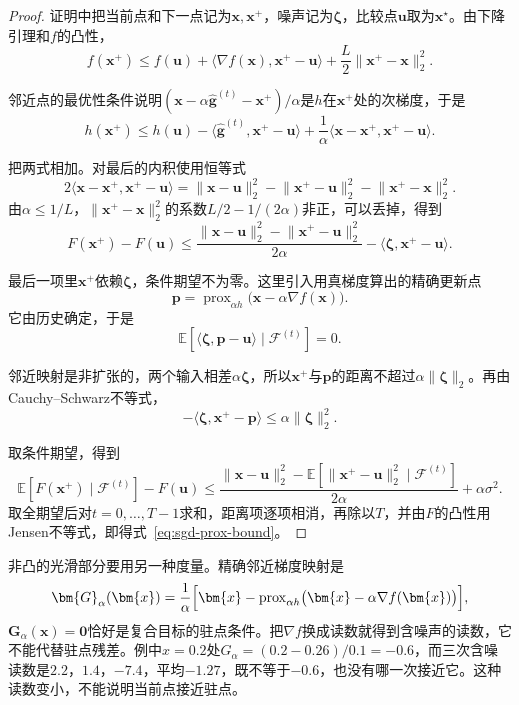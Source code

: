 \begin{proof}
证明中把当前点和下一点记为$\bm{x},\bm{x}^+$，噪声记为$\bm{\zeta}$，比较点$\bm{u}$取为$\bm{x}^\star$。由下降引理和$f$的凸性，
\[
 f(\bm{x}^+)\leq f(\bm{u})+\langle\nabla f(\bm{x}),\bm{x}^+-\bm{u}\rangle+\frac{L}{2}\lVert\bm{x}^+-\bm{x}\rVert_2^2.
\]

邻近点的最优性条件说明$(\bm{x}-\alpha\hat{\bm{g}}^{(t)}-\bm{x}^+)/\alpha$是$h$在$\bm{x}^+$处的次梯度，于是
\[
 h(\bm{x}^+)\leq h(\bm{u})-\langle\hat{\bm{g}}^{(t)},\bm{x}^+-\bm{u}\rangle+\frac{1}{\alpha}\langle\bm{x}-\bm{x}^+,\bm{x}^+-\bm{u}\rangle.
\]

把两式相加。对最后的内积使用恒等式
\[
 2\langle\bm{x}-\bm{x}^+,\bm{x}^+-\bm{u}\rangle=\lVert\bm{x}-\bm{u}\rVert_2^2-\lVert\bm{x}^+-\bm{u}\rVert_2^2-\lVert\bm{x}^+-\bm{x}\rVert_2^2.
\]
由$\alpha\leq1/L$，$\lVert\bm{x}^+-\bm{x}\rVert_2^2$的系数$L/2-1/(2\alpha)$非正，可以丢掉，得到
\[
 F(\bm{x}^+)-F(\bm{u})\leq\frac{\lVert\bm{x}-\bm{u}\rVert_2^2-\lVert\bm{x}^+-\bm{u}\rVert_2^2}{2\alpha}-\langle\bm{\zeta},\bm{x}^+-\bm{u}\rangle.
\]

最后一项里$\bm{x}^+$依赖$\bm{\zeta}$，条件期望不为零。这里引入用真梯度算出的精确更新点
\[
 \bm{p}=\operatorname{prox}_{\alpha h}\bigl(\bm{x}-\alpha\nabla f(\bm{x})\bigr).
\]
它由历史确定，于是
\[
 \mathbb{E}[\langle\bm{\zeta},\bm{p}-\bm{u}\rangle\mid\mathcal{F}^{(t)}]=0.
\]

邻近映射是非扩张的，两个输入相差$\alpha\bm{\zeta}$，所以$\bm{x}^+$与$\bm{p}$的距离不超过$\alpha\lVert\bm{\zeta}\rVert_2$。再由Cauchy--Schwarz不等式，
\[
 -\langle\bm{\zeta},\bm{x}^+-\bm{p}\rangle\leq\alpha\lVert\bm{\zeta}\rVert_2^2.
\]

取条件期望，得到
\[
 \mathbb{E}[F(\bm{x}^+)\mid\mathcal{F}^{(t)}]-F(\bm{u})\leq\frac{\lVert\bm{x}-\bm{u}\rVert_2^2-\mathbb{E}[\lVert\bm{x}^+-\bm{u}\rVert_2^2\mid\mathcal{F}^{(t)}]}{2\alpha}+\alpha\sigma^2.
\]
取全期望后对$t=0,\ldots,T-1$求和，距离项逐项相消，再除以$T$，并由$F$的凸性用Jensen不等式，即得式~\eqref{eq:sgd-prox-bound}。
\end{proof}

非凸的光滑部分要用另一种度量。精确邻近梯度映射是
\begin{equation}
 \bm{G}_\alpha(\bm{x})=\frac{1}{\alpha}\Bigl[\bm{x}-\operatorname{prox}_{\alpha h}\bigl(\bm{x}-\alpha\nabla f(\bm{x})\bigr)\Bigr],
 \label{eq:sgd-prox-mapping}
\end{equation}
$\bm{G}_\alpha(\bm{x})=\bm{0}$恰好是复合目标的驻点条件。把$\nabla f$换成读数就得到含噪声的读数，它不能代替驻点残差。例中$x=0.2$处$G_\alpha=(0.2-0.26)/0.1=-0.6$，而三次含噪读数是$2.2$，$1.4$，$-7.4$，平均$-1.27$，既不等于$-0.6$，也没有哪一次接近它。这种读数变小，不能说明当前点接近驻点。

